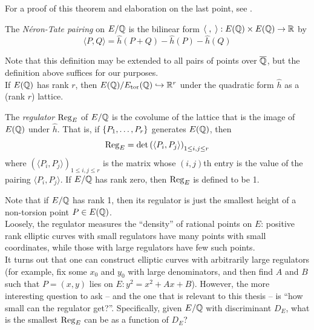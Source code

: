 \documentclass[10pt]{article}
\begin{document}
For a proof of this theorem and elaboration on the last point, see \cite[pp. 227-232]{Sil-1985}.

\begin{definition}
The {\it N\'eron-Tate pairing} on $E/\mathbb{Q}$ is the bilinear form $\langle\;,\;\rangle: E(\mathbb{Q})\times E(\mathbb{Q}) \to \mathbb{R}$ by
	\begin{equation}
		\langle P,Q \rangle = \hat{h}(P+Q) - \hat{h}(P) - \hat{h}(Q)
	\end{equation}
\end{definition}
Note that this definition may be extended to all pairs of points over $\overline{\mathbb{Q}}$, but the definition above suffices for our purposes. \\

If $E(\mathbb{Q})$ has rank $r$, then $E(\mathbb{Q})/E_{\text{tor}}(\mathbb{Q}) \hookrightarrow \mathbb{R}^r$ under the quadratic form $\hat{h}$ as a (rank $r$) lattice.

\begin{definition}
The {\it regulator} $\operatorname{Reg}_E$ of $E/\mathbb{Q}$ is the covolume of the lattice that is the image of $E(\mathbb{Q})$ under $\hat{h}$. That is, if $\left\{P_1,\ldots,P_r\right\}$ generates $E(\mathbb{Q})$, then
\begin{equation}
	\operatorname{Reg}_E = \det\left(\langle P_i,P_j\rangle \right)_{1 \le i,j \le r}
\end{equation}
where $\left(\langle P_i,P_j\rangle \right)_{1 \le i,j \le r}$ is the matrix whose $(i,j)$th entry is the value of the pairing $\langle P_i,P_j\rangle$. If $E/\mathbb{Q}$ has rank zero, then $\operatorname{Reg}_E$ is defined to be 1.
\end{definition}
Note that if $E/\mathbb{Q}$ has rank 1, then its regulator is just the smallest height of a non-torsion point $P \in E(\mathbb{Q})$. \\

Loosely, the regulator measures the ``density'' of rational points on $E$: positive rank elliptic curves with small regulators have many points with small coordinates, while those with large regulators have few such points.\\

It turns out that one can construct elliptic curves with arbitrarily large regulators (for example, fix some $x_0$ and $y_0$ with large denominators, and then find $A$ and $B$ such that $P=(x,y)$ lies on $E: y^2 = x^2 + Ax + B$). However, the more interesting question to ask -- and the one that is relevant to this thesis -- is ``how small can the regulator get?''. Specifically, given $E/\mathbb{Q}$ with discriminant $D_E$, what is the smallest $\operatorname{Reg}_E$ can be as a function of $D_E$?
\end{document}
